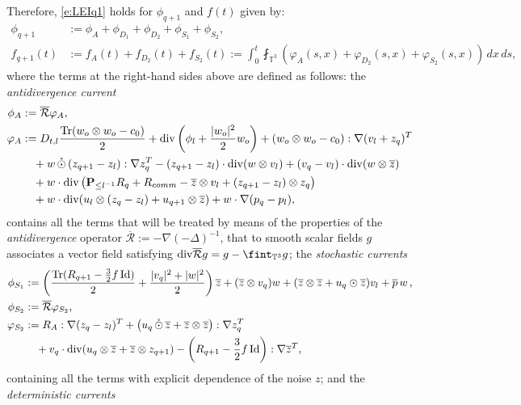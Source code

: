 \documentclass[10pt,a4paper]{amsart}
\numberwithin{equation}{section}
\numberwithin{corollario}{section}
\numberwithin{lemma}{section}
\numberwithin{prop}{section}
\theoremstyle{definition}
\theoremstyle{remark}
\newcommand{\T}{\mathbb{T}}
\newcommand{\dvg}{\mathord{{\rm div}}}
\newcommand{\Id}{\mathrm{Id}}
\newcommand{\varz}{\overline{z}}
\newcommand{\varp}{\overline{p}}
\newcommand{\proj}{\mathbf{P}}
\DeclareMathOperator{\Tr}{Tr}
\newcommand{\qq}{_{q+1}}
\newcommand{\SymOt}{\odot}
\newcommand{\SymOtNoTr}{\,\mathring{\odot}\,}
\begin{document}
Therefore, \eqref{e:LEIq1} holds for $\phi\qq$ and $f(t)$ given by:
\begin{align}
    \phi\qq&:=\phi_A+ \phi_{D_1}+\phi_{D_2}+\phi_{S_1}+\phi_{S_2},
    \\
    \label{e:f}
    f_{q+1}(t)
    &:=
    f_A(t)+f_{D_2}(t)+f_{S_2}(t)
    :=
    \int_0^t\fint_{\T^3} \left( \varphi_A(s,x)+\varphi_{D_2}(s,x)+\varphi_{S_2}(s,x) \right)\,dx\,ds,
    \end{align}
    where the terms at the right-hand sides above are defined as follows: the \emph{antidivergence current}
    \begin{align}
    \label{e:phiA}
\phi_A
&:=
\overline{\mathcal{R}} \varphi_A,
\\
\varphi_A  \label{e:varphiA}
&:= 
D_{t,l}\frac{\Tr(w_o \otimes w_o-c_0)}{2}
+
\dvg\left(\phi_l+\frac{|w_o|^2}{2}w_o\right)
+
\left(w_o \otimes w_o-c_0\right):\nabla(v_l+z_q)^T
\\
    &\quad+
    w\SymOtNoTr(z\qq-z_l):\nabla z_q^T-(z\qq-z_l)\cdot\dvg(w\otimes v_l)+(v_q-v_l)\cdot \dvg(w\otimes \varz) 
    \\
    &\quad+
    w\cdot\dvg\left(\proj_{\le l^{-1}}R_q+R_{comm}-\varz\otimes v_l+(z\qq-z_l)\otimes z_q\right)
    \\
    &\quad+
    w\cdot \dvg(u_l\otimes(z_q-z_l)+u\qq\otimes \varz)+w\cdot \nabla(p_q-p_l),
    \end{align}
contains all the terms that will be treated by means of the properties of the \emph{antidivergence} operator $\overline{\mathcal{R}} := -\nabla (-\Delta)^{-1}$, that to smooth scalar fields $g$ associates a vector field satisfying $\dvg \overline{\mathcal{R}} g = g - \fint_{\T^3}g$; 
the \emph{stochastic currents} 
\begin{align}
    \label{e:phiS1}\phi_{S_1}&:=\left(\frac{\Tr(R\qq-\frac32f\,\Id)}{2}+\frac{|v_q|^2+|w|^2}{2}\right)\varz+(\varz\otimes v_q)w+(\varz \otimes \varz+u_q\SymOt\varz)v_l+\varp \,w\,,
    \\
    \label{e:phiS2} 
        \phi_{S_2}
        &:=
\overline{\mathcal{R}} \varphi_{S_2},
\\
\varphi_{S_2}  \label{e:varphiS2}
&:=
R_A:\nabla (z_q-z_l)^T+\left(u_q\SymOtNoTr\varz+\varz \otimes \varz\right):\nabla z_q^T
\\
&\quad+
v_q\cdot \dvg(u_q\otimes \varz+\varz\otimes z\qq)-\left(R\qq-\frac32 f\,\Id\right):\nabla\varz^T,
    \end{align}
containing all the terms with explicit dependence of the noise $z$; and the \emph{deterministic currents}
\end{document}
